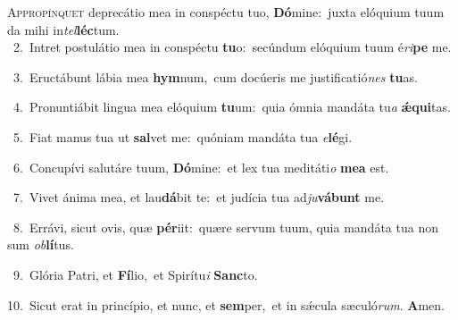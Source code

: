 \lettrine{\initial\textcolor{\initialcolor}{A}}{ppropínquet} deprecátio mea in conspéctu tuo, \textbf{Dó}\-mine:~\star juxta elóquium tuum da mihi in\-\textit{tel}\-\textbf{léc}tum.\\
{\numbfont\textcolor{\numbcolor}{~2.}}~Intret postulátio mea in conspéctu \textbf{tu}\-o:~\star secúndum elóquium tuum é\-\textit{ri}\-\textbf{pe} me.\par
{\numbfont\textcolor{\numbcolor}{~3.}}~Eructábunt lábia mea \textbf{hym}\-num,~\star cum docúeris me justificatió\textit{nes} \textbf{tu}\-as.\par
{\numbfont\textcolor{\numbcolor}{~4.}}~Pronuntiábit lingua mea elóquium \textbf{tu}\-um:~\star quia ómnia mandáta tu\textit{a} \textbf{ǽ}\-\textbf{qui}tas.\par
{\numbfont\textcolor{\numbcolor}{~5.}}~Fiat manus tua ut \textbf{sal}\-vet me:~\star quóniam mandáta tua \textit{e}\-\textbf{lé}gi.\par
{\numbfont\textcolor{\numbcolor}{~6.}}~Concupívi salutáre tuum, \textbf{Dó}\-mine:~\star et lex tua meditáti\textit{o} \textbf{me}\-\textbf{a} est.\par
{\numbfont\textcolor{\numbcolor}{~7.}}~Vivet ánima mea, et lau\-\textbf{dá}\-bit te:~\star et judícia tua ad\-\textit{ju}\-\textbf{vá}\textbf{bunt} me.\par
{\numbfont\textcolor{\numbcolor}{~8.}}~Errávi, sicut ovis, quæ \textbf{pér}\-iit:~\star quære servum tuum, quia mandáta tua non sum \textit{ob}\-\textbf{lí}tus.\par
{\numbfont\textcolor{\numbcolor}{~9.}}~Glória Patri, et \textbf{Fí}\-lio,~\star et Spirítu\textit{i} \textbf{Sanc}\-to.\par
{\numbfont\textcolor{\numbcolor}{10.}}~Sicut erat in princípio, et nunc, et \textbf{sem}\-per,~\star et in sǽcula sæculó\-\textit{rum}\-. \textbf{A}\-men.\par
